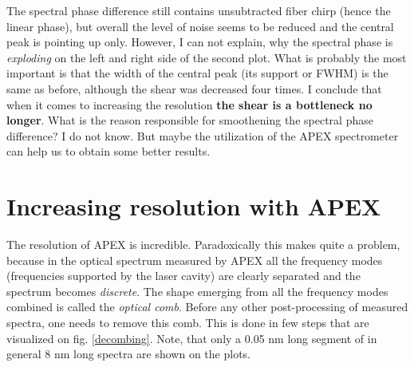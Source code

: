\documentclass{article}
\begin{document}
The spectral phase difference still contains unsubtracted fiber chirp (hence the linear phase), but overall the level of noise seems to be reduced and the central peak is pointing up only. However, I can not explain, why the spectral phase is \emph{exploding} on the left and right side of the second plot. What is probably the most important is that the width of the central peak (its support or FWHM) is the same as before, although the shear was decreased four times. I conclude that when it comes to increasing the resolution \textbf{the shear is a bottleneck no longer}. What is the reason responsible for smoothening the spectral phase difference? I do not know. But maybe the utilization of the APEX spectrometer can help us to obtain some better results.

\pagebreak
\section{Increasing resolution with APEX}

The resolution of APEX is incredible. Paradoxically this makes quite a problem, because in the optical spectrum measured by APEX all the frequency modes (frequencies supported by the laser cavity) are clearly separated and the spectrum becomes \emph{discrete}. The shape emerging from all the frequency modes combined is called the \emph{optical comb}. Before any other post-processing of measured spectra, one needs to remove this comb. This is done in few steps that are visualized on fig. \ref{decombing}. Note, that only a 0.05 nm long segment of in general 8 nm long spectra are shown on the plots.
\end{document}
